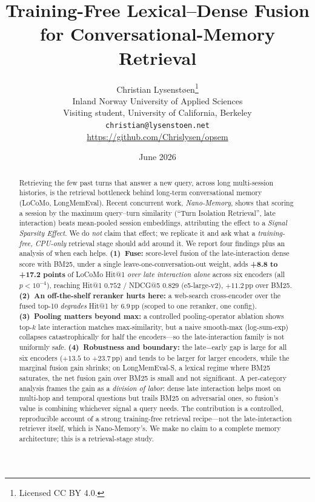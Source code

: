 \documentclass[10pt,twocolumn]{article}
\title{\bfseries Training-Free Lexical--Dense Fusion\\
for Conversational-Memory Retrieval}
\author{Christian Lysenst{\o}en\thanks{Licensed CC BY 4.0.}\\[2pt]
\small Inland Norway University of Applied Sciences\\
\small Visiting student, University of California, Berkeley\\
\small \texttt{christian@lysenstoen.net}\\[2pt]
\small \url{https://github.com/Chrislysen/opsem}}
\date{June 2026}
\begin{document}
\maketitle

\begin{abstract}
\noindent
Retrieving the few past turns that answer a new query, across long
multi-session histories, is the retrieval bottleneck behind long-term
conversational memory (LoCoMo, LongMemEval). Recent concurrent work,
\emph{Nano-Memory}, shows that scoring a session by the maximum query--turn
similarity (``Turn Isolation Retrieval'', late interaction) beats mean-pooled
session embeddings, attributing the effect to a \emph{Signal Sparsity Effect}.
We do \emph{not} claim that effect; we replicate it and ask what a
\emph{training-free, CPU-only} retrieval stage should add around it. We report
four findings plus an analysis of when each helps. \textbf{(1)~Fuse:} score-level fusion of the late-interaction
dense score with BM25, under a single leave-one-conversation-out weight, adds
\textbf{+8.8 to +17.2 points} of LoCoMo Hit@1 \emph{over late interaction
alone} across six encoders (all $p<10^{-4}$), reaching Hit@1 $0.752$ / NDCG@5
$0.829$ (e5-large-v2), $+11.2$\,pp over BM25. \textbf{(2)~An off-the-shelf
reranker hurts here:} a web-search cross-encoder over the fused top-10
\emph{degrades} Hit@1 by $6.9$\,pp (scoped to one reranker, one config). \textbf{(3)~Pooling matters beyond max:} a
controlled pooling-operator ablation shows top-$k$ late interaction matches
max-similarity, but a naive smooth-max (log-sum-exp) collapses
catastrophically for half the encoders---so the late-interaction family is not
uniformly safe. \textbf{(4)~Robustness and boundary:} the late$-$early gap is
large for all six encoders ($+13.5$ to $+23.7$\,pp) and tends to be larger for
larger encoders, while the marginal fusion gain shrinks; on LongMemEval-S, a
lexical regime where BM25 saturates, the net fusion gain over BM25 is small and
not significant. A per-category analysis frames the gain as a \emph{division of
labor}: dense late interaction helps most on multi-hop and temporal questions
but trails BM25 on adversarial ones, so fusion's value is combining whichever
signal a query needs. The contribution is a controlled, reproducible account
of a strong training-free retrieval recipe---not the late-interaction
retriever itself, which is Nano-Memory's. We make no claim to a complete
memory architecture; this is a retrieval-stage study.
\end{abstract}
\end{document}
